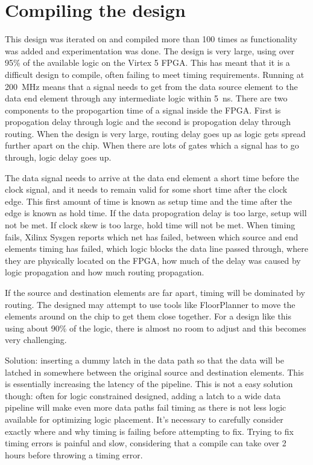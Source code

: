 \section{Compiling the design}
This design was iterated on and compiled more than 100 times as functionality was added and experimentation was done.
The design is very large, using over 95\% of the available logic on the Virtex 5 FPGA. This has meant that it is a difficult design to compile, often failing to meet timing requirements.
Running at \SI{200}{\mega\hertz} means that a signal needs to get from the data source element to the data end element through any intermediate logic within \SI{5}{\nano\second}. 
There are two components to the propogartion time of a signal inside the FPGA. First is propogation delay through logic and the second is propogation delay through routing. When the design is very large, routing delay goes up as logic gets spread further apart on the chip. When there are lots of gates which a signal has to go through, logic delay goes up. 

The data signal needs to arrive at the data end element a short time before the clock signal, and it needs to remain valid for some short time after the clock edge. This first amount of time is known as setup time and the time after the edge is known as hold time. If the data propogration delay is too large, setup will not be met. If clock skew is too large, hold time will not be met.
When timing fails, Xilinx Sysgen reports which net has failed, between which source and end elements timing has failed, which logic blocks the data line passed through, where they are physically located on the FPGA, how much of the delay was caused by logic propagation and how much routing propagation. 

If the source and destination elements are far apart, timing will be dominated by routing. The designed may attempt to use tools like FloorPlanner to move the elements around on the chip to get them close together. For a design like this using about 90\% of the logic, there is almost no room to adjust and this becomes very challenging. 

Solution: inserting a dummy latch in the data path so that the data will be latched in somewhere between the original source and destination elements. This is essentially increasing the latency of the pipeline. This is not a easy solution though: often for logic constrained designed, adding a latch to a wide data pipeline will make even more data paths fail timing as there is not less logic available for optimizing logic placement. It's necessary to carefully consider exactly where and why timing is failing before attempting to fix. Trying to fix timing errors is painful and slow, considering that a compile can take over 2 hours before throwing a timing error. 





